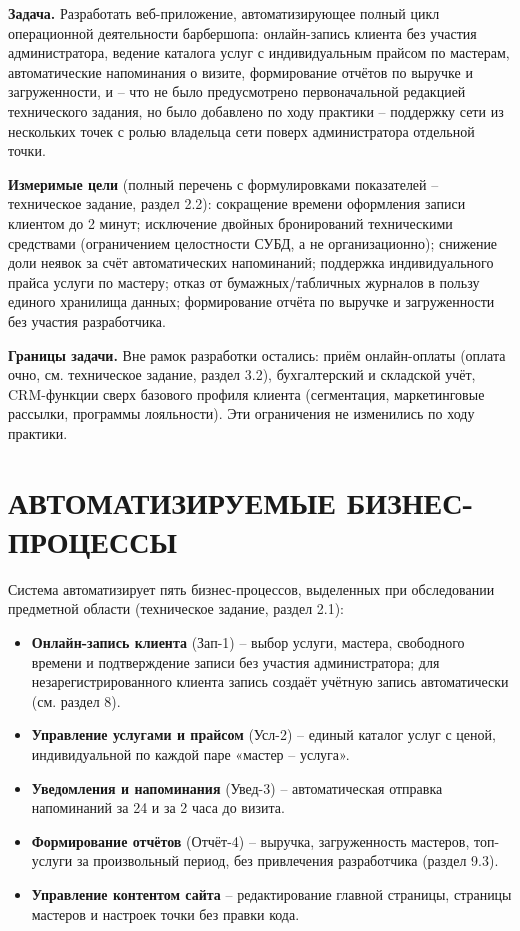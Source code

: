 \textbf{Задача.} Разработать веб-приложение, автоматизирующее полный цикл
операционной деятельности барбершопа: онлайн-запись клиента без участия
администратора, ведение каталога услуг с индивидуальным прайсом по
мастерам, автоматические напоминания о визите, формирование отчётов по
выручке и загруженности, и -- что не было предусмотрено первоначальной
редакцией технического задания, но было добавлено по ходу практики --
поддержку сети из нескольких точек с ролью владельца сети поверх
администратора отдельной точки.

\textbf{Измеримые цели} (полный перечень с формулировками показателей --
техническое задание, раздел 2.2): сокращение времени оформления записи
клиентом до 2 минут; исключение двойных бронирований техническими
средствами (ограничением целостности СУБД, а не организационно);
снижение доли неявок за счёт автоматических напоминаний; поддержка
индивидуального прайса услуги по мастеру; отказ от бумажных/табличных
журналов в пользу единого хранилища данных; формирование отчёта по
выручке и загруженности без участия разработчика.

\textbf{Границы задачи.} Вне рамок разработки остались: приём онлайн-оплаты
(оплата очно, см. техническое задание, раздел 3.2), бухгалтерский и
складской учёт, CRM-функции сверх базового профиля клиента (сегментация,
маркетинговые рассылки, программы лояльности). Эти ограничения не
изменились по ходу практики.

\section{АВТОМАТИЗИРУЕМЫЕ БИЗНЕС-ПРОЦЕССЫ}

Система автоматизирует пять бизнес-процессов, выделенных при
обследовании предметной области (техническое задание, раздел 2.1):

\begin{itemize}
  \item \textbf{Онлайн-запись клиента} (Зап-1) -- выбор услуги, мастера,
        свободного времени и подтверждение записи без участия
        администратора; для незарегистрированного клиента запись создаёт
        учётную запись автоматически (см. раздел 8).
  \item \textbf{Управление услугами и прайсом} (Усл-2) -- единый каталог
        услуг с ценой, индивидуальной по каждой паре «мастер -- услуга».
  \item \textbf{Уведомления и напоминания} (Увед-3) -- автоматическая
        отправка напоминаний за 24 и за 2 часа до визита.
  \item \textbf{Формирование отчётов} (Отчёт-4) -- выручка, загруженность
        мастеров, топ-услуги за произвольный период, без привлечения
        разработчика (раздел 9.3).
  \item \textbf{Управление контентом сайта} -- редактирование главной
        страницы, страницы мастеров и настроек точки без правки кода.
\end{itemize}

